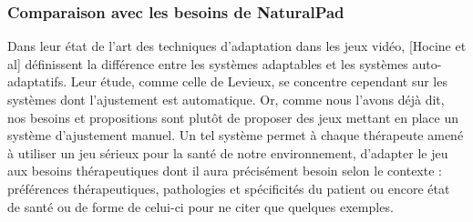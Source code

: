 	\subsubsection*{Comparaison avec les besoins de NaturalPad}
Dans leur état de l'art des techniques d'adaptation dans les jeux vidéo, [Hocine et al] définissent la différence entre les systèmes adaptables et les systèmes auto-adaptatifs. Leur étude, comme celle de Levieux, se concentre cependant sur les systèmes dont l'ajustement est automatique. Or, comme nous l'avons déjà dit, nos besoins et propositions sont plutôt de proposer des jeux mettant en place un système d'ajustement manuel. Un tel système permet à chaque thérapeute amené à utiliser un jeu sérieux pour la santé de notre environnement, d'adapter le jeu aux besoins thérapeutiques dont il aura précisément besoin selon le contexte : préférences thérapeutiques, pathologies et spécificités du patient ou encore état de santé ou de forme de celui-ci pour ne citer que quelques exemples.